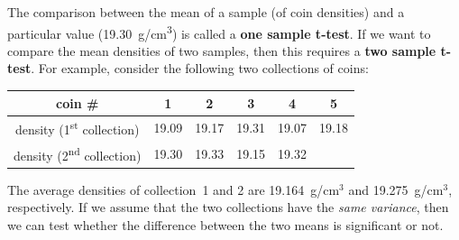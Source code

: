 The comparison between the mean of a sample (of coin densities) and a
particular value (19.30~g/cm\textsuperscript{3}) is called a
\textbf{one sample t-test}. If we want to compare the mean densities
of two samples, then this requires a \textbf{two sample t-test}. For
example, consider the following two collections of coins:

\begin{center}
\begin{tabular}{c|ccccc}
  coin \# & 1 & 2 & 3 & 4 & 5 \\ \hline
  density (1\textsuperscript{st} collection) &
  19.09 & 19.17 & 19.31 & 19.07 & 19.18 \\
  density (2\textsuperscript{nd} collection) &
  19.30 & 19.33 & 19.15 & 19.32
  \label{tab:2setcoins}
\end{tabular}
\end{center}

The average densities of collection~1 and 2 are 19.164~g/cm$^3$ and
19.275~g/cm$^3$, respectively. If we assume that the two collections
have the \textit{same variance}, then we can test whether the
difference between the two means is significant or not.

